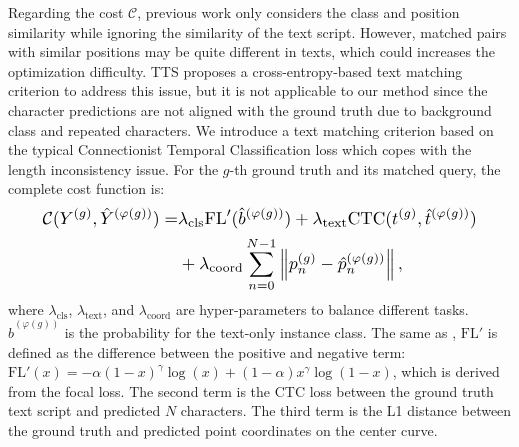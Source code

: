 \documentclass[10pt,twocolumn,letterpaper]{article}
\begin{document}
Regarding the cost $\mathcal{C}$, previous work \cite{zhang2022text} only considers the class and position similarity while ignoring the similarity of the text script. However, matched pairs with similar positions may be quite different in texts, which could increases the optimization difficulty. TTS \cite{kittenplon2022towards} proposes a cross-entropy-based text matching criterion to address this issue, but it is not applicable to our method since the character predictions are not aligned with the ground truth due to background class and repeated characters. We introduce a text matching criterion based on the typical Connectionist Temporal Classification loss \cite{graves2006connectionist} which copes with the length inconsistency issue. For the $g$-th ground truth and its matched query, the complete cost function is:
\begin{equation}
\resizebox{.9\linewidth}{!}{$\begin{aligned}
    \mathcal{C}(Y^{(g)}, \hat{Y}^{(\varphi(g))}) = & \lambda_{\text{cls}}\text{FL}'(\hat{b}^{(\varphi(g))}) + \lambda_{\text{text}} \text{CTC}(t^{(g)}, \hat{t}^{(\varphi(g))}) \\
    & + \lambda_{\text{coord}} \sum_{n=0}^{N-1} \left\| p_n^{(g)} - \hat{p}_n^{(\varphi(g))}\right\|,
\end{aligned}$} \label{eq_5}
\end{equation}
where $\lambda_{\text{cls}}$, $\lambda_{\text{text}}$, and $\lambda_{\text{coord}}$ are hyper-parameters to balance different tasks. $\hat{b}^{(\varphi(g))}$ is the probability for the text-only instance class. The same as \cite{zhang2022text}, $\text{FL}'$ is defined as the difference between the positive and negative term: $\text{FL}'(x)=-\alpha (1-x)^\gamma \log(x) + (1-\alpha) x^\gamma \log(1-x)$, which is derived from the focal loss\cite{lin2017focal}. The second term is the CTC loss between the ground truth text script and predicted $N$ characters. The third term is the L1 distance between the ground truth and predicted point coordinates on the center curve.
\end{document}
